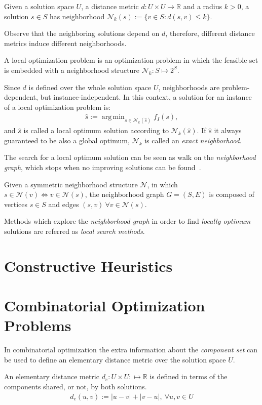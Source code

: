 \documentclass[12pt]{llncs}
\DeclareMathOperator*{\argmin}{arg\,min}
\begin{document}
\begin{definition}[$k$-neighborhood]
Given a solution space $U$, a distance metric $d : U\times U \mapsto \mathbb{R}$ and a radius $k>0$, a solution $s\in S$ has neighborhood $\mathcal{N}_k(s) :=\{v\in S : d(s,v) \leq k\}$.
\end{definition}

Observe that the neighboring solutions depend on $d$, therefore, different distance metrics induce different neighborhoods.

\begin{definition} A local optimization problem is an optimization problem in which the feasible set is embedded with a neighborhood structure $\mathcal{N}_k: S \mapsto 2^S$.
\end{definition}


Since $d$ is defined over the whole solution space $U$,  neighborhoods are problem-dependent, but instance-independent. In this context, a solution for an instance of a local optimization problem is:
\begin{align}
\hat{s} := \argmin_{s\in \mathcal{N}_k(\hat{s})} {f_I(s)},
\end{align}
and $\hat{s}$ is called a local optimum solution according to $\mathcal{N}_k(\hat{s})$. If $\hat{s}$ it always guaranteed to be also a global optimum, $\mathcal{N}_k$ is called an \textit{exact neighborhood}.

The search for a local optimum solution can be seen as walk on the \textit{neighborhood graph}, which stops when no improving solutions can be found~\citep{stutzle1999local}.
\begin{definition}
Given a symmetric neighborhood structure $\mathcal{N}$, in which $s\in \mathcal{N}(v) \iff v\in \mathcal{N}(s)$, the neighborhood graph $G=(S,E)$ is composed of vertices $s\in S$ and edges $(s,v)~\forall v\in \mathcal{N}(s)$.
\end{definition}

Methods which explore the \textit{neighborhood graph} in order to find \textit{locally optimum} solutions are referred as \textit{local search methods}.

\section{Constructive Heuristics}

\section{Combinatorial Optimization Problems}
In combinatorial optimization the extra information about the \textit{component set} can be used to define an elementary distance metric over the solution space $U$.
\begin{definition}
An elementary distance metric $d_e : U\times U: \mapsto \mathbb{R}$ is defined in terms of the components shared, or not, by both solutions. 
\begin{align}
d_e(u,v) :=  |u - v| + |v - u|,~\forall u,v\in U
\end{align}
\end{definition}
\end{document}
